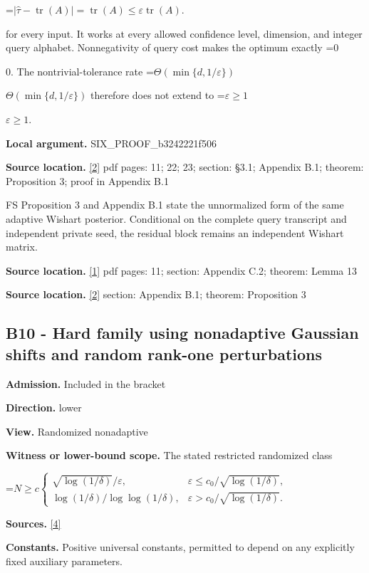 \documentclass[10pt,a4paper]{article}
\newcommand{\AtlasMath}[1]{\par\begingroup\centering\setbox0=\hbox{$\displaystyle #1$}\ifdim\wd0>1.4\linewidth\typeout{ATLAS WIDE FORMULA: \the\wd0}\fi\ifdim\wd0>\linewidth\resizebox{\linewidth}{!}{\box0}\else\box0\fi\par\endgroup}
\newcommand{\AtlasInlineMath}[1]{\begingroup\setbox0=\hbox{$#1$}\ifdim\wd0>.4\linewidth\endgroup\AtlasMath{#1}\else\endgroup$#1$\fi}
\begin{document}
\AtlasMath{|\widehat\tau-\operatorname{tr}(A)|=\operatorname{tr}(A)\le\varepsilon\operatorname{tr}(A).}

for every input. It works at every allowed confidence level, dimension, and integer query alphabet. Nonnegativity of query cost makes the optimum exactly \AtlasInlineMath{0}. The nontrivial-tolerance rate \AtlasInlineMath{\Theta(\min\{d,1/\varepsilon\})} therefore does not extend to \AtlasInlineMath{\varepsilon\ge1}.

\textbf{Local argument.} SIX\_\allowbreak{}PROOF\_\allowbreak{}b3242221f506

\textbf{Source location.} \href{https://arxiv.org/pdf/2402.09379v3}{[2]} pdf pages: 11; 22; 23; section: §3.1; Appendix B.1; theorem: Proposition 3; proof in Appendix B.1

FS Proposition 3 and Appendix B.1 state the unnormalized form of the same adaptive Wishart posterior. Conditional on the complete query transcript and independent private seed, the residual block remains an independent Wishart matrix.

\textbf{Source location.} \href{https://proceedings.mlr.press/v125/braverman20a/braverman20a.pdf}{[1]} pdf pages: 11; section: Appendix C.2; theorem: Lemma 13

\textbf{Source location.} \href{https://arxiv.org/pdf/2402.09379v3}{[2]} section: Appendix B.1; theorem: Proposition 3

\subsection{B10 - Hard family using nonadaptive Gaussian shifts and random rank-one perturbations}
\textbf{Admission.} Included in the bracket

\textbf{Direction.} lower

\textbf{View.} Randomized nonadaptive

\textbf{Witness or lower-bound scope.} The stated restricted randomized class

\AtlasMath{N\ge c\begin{cases}\sqrt{\log(1/\delta)}/\varepsilon,&\varepsilon\le c_0/\sqrt{\log(1/\delta)},\\\log(1/\delta)/\log\log(1/\delta),&\varepsilon>c_0/\sqrt{\log(1/\delta)}.\end{cases}}
\textbf{Sources.} \href{https://proceedings.neurips.cc/paper/2021/file/c77bfda61a0204d445185053e6a9a8fe-Paper.pdf}{[4]}

\textbf{Constants.} Positive universal constants, permitted to depend on any explicitly fixed auxiliary parameters.
\end{document}
